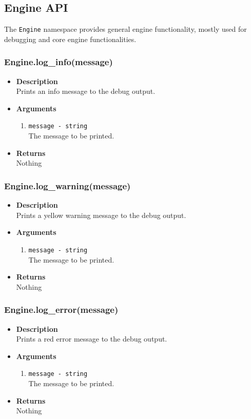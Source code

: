 \documentclass[12pt,a4paper]{article}
\begin{document}
\subsection{Engine API}

The \texttt{Engine} namespace provides general engine functionality, mostly used for debugging and core engine functionalities.


\subsubsection{Engine.log\_info(message)}
\begin{itemize}
	\item[]{\bf Description}
		\\ Prints an info message to the debug output.
	\item[]{\bf Arguments}
	\begin{enumerate}
		\item{\texttt{message - string}} 
			\\ The message to be printed.
	\end{enumerate}
	\item[]{\bf Returns}
		\\ Nothing
\end{itemize}

\subsubsection{Engine.log\_warning(message)}
\begin{itemize}
	\item[]{\bf Description}
		\\ Prints a yellow warning message to the debug output.
	\item[]{\bf Arguments}
	\begin{enumerate}
		\item{\texttt{message - string}} 
			\\ The message to be printed.
	\end{enumerate}
	\item[]{\bf Returns}
		\\ Nothing
\end{itemize}

\subsubsection{Engine.log\_error(message)}
\begin{itemize}
	\item[]{\bf Description}
		\\ Prints a red error message to the debug output.
	\item[]{\bf Arguments}
	\begin{enumerate}
		\item{\texttt{message - string}} 
			\\ The message to be printed.
	\end{enumerate}
	\item[]{\bf Returns}
		\\ Nothing
\end{itemize}
\end{document}
